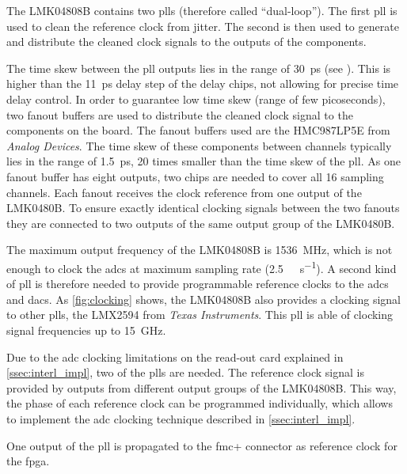 The LMK04808B contains two \glspl{pll} (therefore called ``dual-loop''). 
The first \gls{pll} is used to clean the reference clock from jitter. 
The second is then used to generate and distribute the cleaned clock signals to the outputs of the components.

The time skew between the \gls{pll} outputs lies in the range of \SI{30}{\pico \second} (see \cite{lmk04808b}).
This is higher than the \SI{11}{\pico \second} delay step of the delay chips, not allowing for precise time delay control. 
In order to guarantee low time skew (range of few picoseconds), two fanout buffers are used to distribute the cleaned clock signal to the components on the board.
The fanout buffers used are the HMC987LP5E from \textit{Analog Devices}.
The time skew of these components between channels typically lies in the range of \SI{1.5}{\pico \second}, 20 times smaller than the time skew of the \gls{pll}.
As one fanout buffer has eight outputs, two chips are needed to cover all 16 sampling channels. 
Each fanout receives the clock reference from one output of the LMK0480B. 
To ensure exactly identical clocking signals between the two fanouts they are connected to two outputs of the same output group of the LMK0480B.

The maximum output frequency of the LMK04808B is \SI{1536}{\mega \hertz}, which is not enough to clock the \glspl{adc} at maximum sampling rate (\SI{2.5}{\giga \sample \per \second}). 
A second kind of \gls{pll} is therefore needed to provide programmable reference clocks to the \glspl{adc} and \glspl{dac}.
As \autoref{fig:clocking} shows, the LMK04808B also provides a clocking signal to other \glspl{pll}, the LMX2594 from \textit{Texas Instruments}.
This \gls{pll} is able of clocking signal frequencies up to \SI{15}{\giga \hertz}.

Due to the \gls{adc} clocking limitations on the read-out card explained in \autoref{ssec:interl_impl}, two of the \glspl{pll} are needed. 
The reference clock signal is provided by outputs from different output groups of the LMK04808B. This way, the phase of each reference clock can be programmed individually, which allows to implement the \gls{adc} clocking technique described in \autoref{ssec:interl_impl}.

One output of the \gls{pll} is propagated to the \gls{fmc}+ connector as reference clock for the \gls{fpga}.


